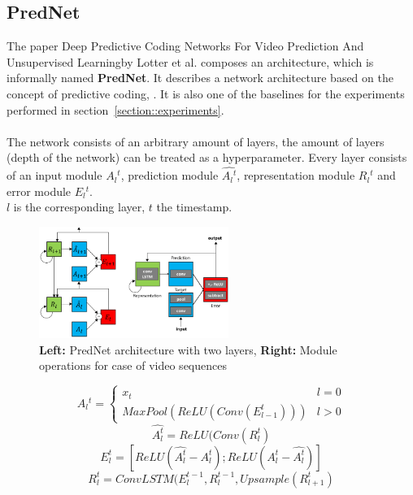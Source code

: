  \subsection{PredNet}
  The paper \glqq Deep Predictive Coding Networks For Video Prediction And Unsupervised Learning\grqq by Lotter et al. \cite{Lotter2016} composes an architecture, which is informally named
  \textbf{PredNet}. It describes a network architecture based on the concept of \glqq predictive coding\grqq \cite{Rao1999}, \cite{Friston2005}. It is also one of the baselines for the experiments performed
  in section~\ref{section::experiments}.
  \\\\  
  The network consists of an arbitrary amount of layers, the amount of layers (depth of the network) can be treated as a hyperparameter. Every layer consists
  of an input module $A{_l}^t$, prediction module $\hat{A{_l}^t}$, representation module $R{_l}^t$ and error module $E{_l}^t$.\\
  $l$ is the corresponding layer, $t$ the timestamp.
  \begin{figure}[H]
   \includegraphics[width=0.55\textwidth]{../Images/lotter.png}
   \centering
   \caption{\textbf{Left:} PredNet architecture with two layers, \textbf{Right:} \glqq Module operations for case of video sequences\grqq \cite{Lotter2016}}
   \label{fig:lotter_architecture}
  \end{figure}
  \begin{equation}
   A{_l}^t = \begin{cases} x_t & l = 0 \\ MaxPool(ReLU(Conv(E_{l-1}^t))) & l > 0 \end{cases}
  \end{equation}
  \begin{equation}
   \hat{A_l^t} = ReLU(Conv(R_l^t)
  \end{equation}
  \begin{equation}
   E_l^t = [ReLU(\hat{A_l^t} - A_l^t); ReLU(A_l^t - \hat{A_l^t})]
  \end{equation}
  \begin{equation}
   R_l^t = ConvLSTM(E_l^{t-1}, R_l^{t-1}, Upsample(R_{l+1}^t)
  \end{equation}\noindent
